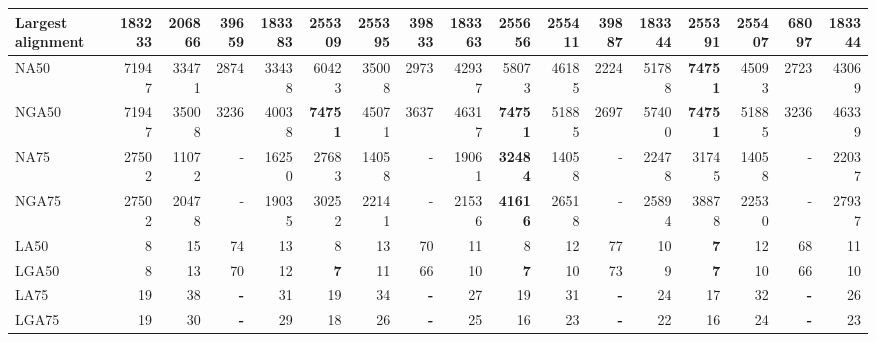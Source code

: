 \documentclass[12pt,a4paper]{article}
\begin{document}
\begin{table}[ht]
\begin{center}
\begin{tabular}{|l*{16}{|r}|}
Largest alignment & 183233 & 206866 & 39659 & 183383 & 255309 & 255395 & 39833 & 183363 & {\bf 255656} & 255411 & 39887 & 183344 & 255391 & 255407 & 68097 & 183344 \\ \hline
NA50 & 71947 & 33471 & 2874 & 33438 & 60423 & 35008 & 2973 & 42937 & 58073 & 46185 & 2224 & 51788 & {\bf 74751} & 45093 & 2723 & 43069 \\ \hline
NGA50 & 71947 & 35008 & 3236 & 40038 & {\bf 74751} & 45071 & 3637 & 46317 & {\bf 74751} & 51885 & 2697 & 57400 & {\bf 74751} & 51885 & 3236 & 46339 \\ \hline
NA75 & 27502 & 11072 & - & 16250 & 27683 & 14058 & - & 19061 & {\bf 32484} & 14058 & - & 22478 & 31745 & 14058 & - & 22037 \\ \hline
NGA75 & 27502 & 20478 & - & 19035 & 30252 & 22141 & - & 21536 & {\bf 41616} & 26518 & - & 25894 & 38878 & 22530 & - & 27937 \\ \hline
LA50 & 8 & 15 & 74 & 13 & 8 & 13 & 70 & 11 & 8 & 12 & 77 & 10 & {\bf 7} & 12 & 68 & 11 \\ \hline
LGA50 & 8 & 13 & 70 & 12 & {\bf 7} & 11 & 66 & 10 & {\bf 7} & 10 & 73 & 9 & {\bf 7} & 10 & 66 & 10 \\ \hline
LA75 & 19 & 38 & {\bf -} & 31 & 19 & 34 & {\bf -} & 27 & 19 & 31 & {\bf -} & 24 & 17 & 32 & {\bf -} & 26 \\ \hline
LGA75 & 19 & 30 & {\bf -} & 29 & 18 & 26 & {\bf -} & 25 & 16 & 23 & {\bf -} & 22 & 16 & 24 & {\bf -} & 23 \\ \hline
\end{tabular}
\end{center}
\end{table}
\end{document}
